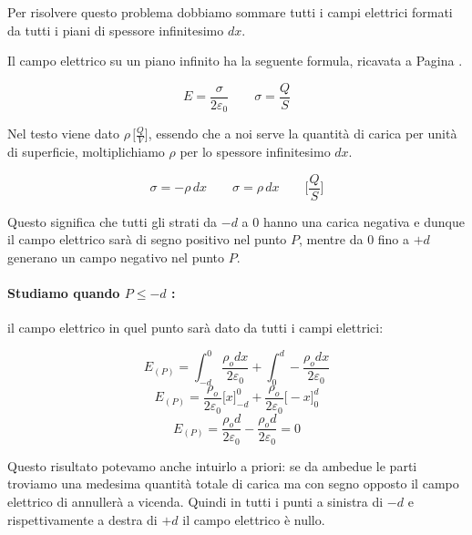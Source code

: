 Per risolvere questo problema dobbiamo sommare tutti i campi elettrici formati da tutti i piani di spessore infinitesimo $dx$.

Il campo elettrico su un piano infinito ha la seguente formula, ricavata a Pagina
\pageref{pianoInfinito}.

\begin{equation*}
    E = \frac{\sigma}{2\varepsilon_0}\qquad\sigma = \frac{Q}{S}
\end{equation*}

Nel testo viene dato $\rho \, \big[\frac{Q}{V}\big]$, essendo che a noi serve la quantità di carica per unità di superficie, moltiplichiamo $\rho$ per lo spessore infinitesimo $dx$.

\begin{equation*}
    \sigma = -\rho\,dx \qquad \sigma = \rho\,dx\qquad\biggl[\frac{Q}{S}\biggl]
\end{equation*}

Questo significa che tutti gli strati da $-d$ a $0$ hanno una carica negativa e dunque il campo elettrico sarà di segno positivo nel punto $P$, mentre da $0$ fino a $+d$ generano un campo negativo nel punto $P$.

\paragraph{Studiamo quando $P \le -d$ :\\}

il campo elettrico in quel punto sarà dato da tutti i campi elettrici:

\begin{equation*}
    E_{(P)} = \int_{-d}^0 \frac{\rho_o dx}{2\varepsilon_0} + \int_0^{d} -\frac{\rho_o dx}{2\varepsilon_0}
\end{equation*}
\begin{equation*}
    E_{(P)} = \frac{\rho_o}{2\varepsilon_0} \big[x\big]_{-d}^0  + \frac{\rho_o }{2\varepsilon_0}\big[-x\big]_0^{d}
\end{equation*}
\begin{equation*}
    E_{(P)} =  \frac{\rho_o d}{2\varepsilon_0} - \frac{\rho_o d}{2\varepsilon_0} = 0
\end{equation*}

Questo risultato potevamo anche intuirlo a priori: se da ambedue le parti troviamo una medesima quantità totale di carica ma con segno opposto il campo elettrico di annullerà a vicenda.
Quindi in tutti i punti a sinistra di $-d$ e rispettivamente a destra di $+d$ il campo elettrico è nullo.



